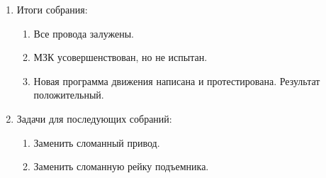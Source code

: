 \begin{enumerate}
\begin{enumerate}
	\end{enumerate}
	
	\item Итоги собрания:
	\begin{enumerate}
		
		\item Все провода залужены.
		
		\item МЗК усовершенствован, но не испытан.
		
        \item Новая программа движения написана и протестирована. Результат положительный.
		
	\end{enumerate}
	
	\item Задачи для последующих собраний:
	\begin{enumerate}
		
		\item Заменить сломанный привод.
		
		\item Заменить сломанную рейку подъемника.
			
	\end{enumerate}
\end{enumerate}
\fillpage
